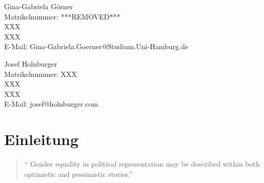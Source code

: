 \documentclass[12pt, 
    twoside=false, 
    bibliography=totoc, 
    numbers=endperiod, 
    headings=normal, 
    toc=chapterentrydotfill
    ]{scrbook}
\begin{document}
\begin{titlepage}
	\begin{minipage}[t]{0.48\textwidth}
    \flushleft 
    Gina-Gabriela Görner \\
    Matrikelnummer: ***REMOVED*** \\
    XXX \vspace{0.1cm} \\ 
	XXX \vspace{0.1cm}  \\
	E-Mail: Gina-Gabriela.Goerner@Studium.Uni-Hamburg.de \\ 
    \end{minipage}
    \begin{minipage}[t]{0.48\textwidth}
	\flushleft
	Josef Holnburger \\
	Matrikelnummer: XXX \\
	XXX \vspace{0.1cm} \\
	XXX \vspace{0.1cm} \\
	E-Mail: josef@holnburger.com \\
    \end{minipage}

\end{titlepage}

\frontmatter

\tableofcontents

\listoffigures
{}
\vspace*{24pt}
{\let\clearpage\relax \listoftables}	

\mainmatter



\chapter{Einleitung}\label{Einleitung} 

\begin{quote}
\enquote{
Gender equality in political representation may be described within both optimistic
and pessimistic stories.} \parencite[149]{celis_2018}
\end{quote}
\end{document}
